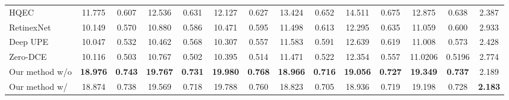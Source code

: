 \documentclass[final]{cvpr}
\begin{document}
\begin{table*}
\begin{center}
{\begin{tabular}{|l|c|c|c|c|c|c|c|c|c|c|c|c|c|}
\cellcolor[HTML]{D5D5D5}HQEC \cite{HQEC} & 11.775 & 0.607 & 12.536 & 0.631 & 12.127 & 0.627 & 13.424 & 0.652 & 14.511 & 0.675 & 12.875 & 0.638 & 2.387\\
\cellcolor[HTML]{D5D5D5}RetinexNet \cite{Chen2018Retinex} & 10.149 & 0.570 & 10.880 & 0.586 & 10.471 & 0.595 & 11.498 & 0.613 & 12.295 & 0.635 & 11.059 & 0.600 & 2.933\\
\cellcolor[HTML]{D5D5D5}Deep UPE \cite{DeepUPE} & 10.047 & 0.532 & 10.462 & 0.568 & 10.307 & 0.557 & 11.583 & 0.591 & 12.639 & 0.619 & 11.008 & 0.573 & 2.428\\
\cellcolor[HTML]{D5D5D5}Zero-DCE \cite{guo2020zero}  & 10.116 & 0.503 & 10.767 & 0.502 & 10.395 & 0.514 & 11.471 & 0.522 & 12.354 & 0.557 & 11.0206 & 0.5196 & 2.774 \\
\hdashline
Our method w/o  & \cellcolor[HTML]{79CC7A}\textbf{18.976} & \cellcolor[HTML]{79CC7A}\textbf{0.743} & \cellcolor[HTML]{79CC7A}\textbf{19.767} & \cellcolor[HTML]{79CC7A}\textbf{0.731} & \cellcolor[HTML]{79CC7A}\textbf{19.980} & \cellcolor[HTML]{79CC7A}\textbf{0.768} & \cellcolor[HTML]{79CC7A}\textbf{18.966} & \cellcolor[HTML]{79CC7A}\textbf{0.716} & \cellcolor[HTML]{79CC7A}\textbf{19.056} & \cellcolor[HTML]{79CC7A}\textbf{0.727} & \cellcolor[HTML]{79CC7A}\textbf{19.349} & \cellcolor[HTML]{79CC7A}\textbf{0.737} & \cellcolor[HTML]{FFFBA3}2.189\\
Our method w/  & \cellcolor[HTML]{FFFBA3}18.874 & \cellcolor[HTML]{FFFBA3}0.738 & \cellcolor[HTML]{FFFBA3}19.569 & \cellcolor[HTML]{FFFBA3}0.718 & \cellcolor[HTML]{FFFBA3}19.788 & \cellcolor[HTML]{FFFBA3}0.760 & \cellcolor[HTML]{FFFBA3}18.823 & \cellcolor[HTML]{FFFBA3}0.705 & \cellcolor[HTML]{FFFBA3}18.936 & \cellcolor[HTML]{FFFBA3}0.719 & \cellcolor[HTML]{FFFBA3}19.198 & \cellcolor[HTML]{FFFBA3}0.728 & \cellcolor[HTML]{79CC7A}\textbf{2.183}\\\hline



\end{tabular}}
\end{center}
\end{table*}
\end{document}

